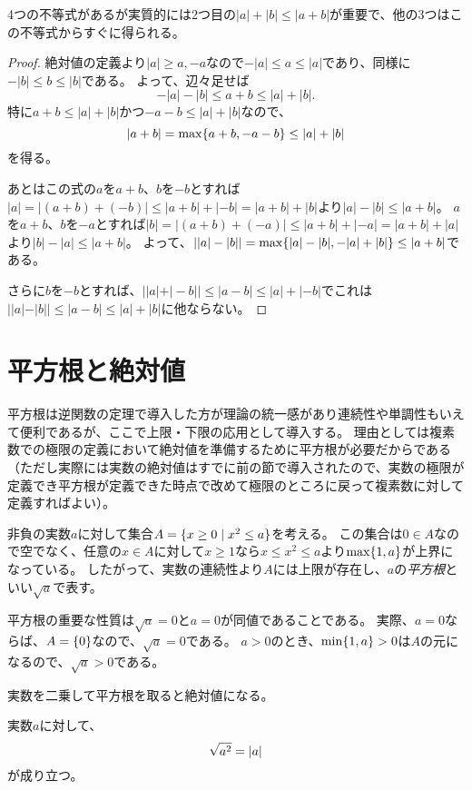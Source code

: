 4つの不等式があるが実質的には2つ目の$|a|+|b| \le |a+b|$が重要で、他の3つはこの不等式からすぐに得られる。

\begin{proof}
絶対値の定義より$|a| \ge a, -a$なので$-|a| \le a \le |a|$であり、同様に$-|b| \le b \le |b|$である。
よって、辺々足せば
$$
-|a|-|b| \le a+b \le |a|+|b|.
$$
特に$a+b \le |a|+|b|$かつ$-a-b \le |a|+|b|$なので、
$$
|a+b| = \max\{ a+b, -a-b \} \le |a|+|b|
$$
を得る。

あとはこの式の$a$を$a+b$、$b$を$-b$とすれば$|a| = |(a+b)+(-b)| \le |a+b|+|-b| = |a+b|+|b|$より$|a|-|b| \le |a+b|$。
$a$を$a+b$、$b$を$-a$とすれば$|b| = |(a+b)+(-a)| \le |a+b|+|-a| = |a+b|+|a|$より$|b|-|a| \le |a+b|$。
よって、$||a|-|b|| = \max\{ |a|-|b|, -|a|+|b| \} \le |a+b|$である。

さらに$b$を$-b$とすれば、$||a|+|-b|| \le |a-b| \le |a|+|-b|$でこれは$||a|-|b|| \le |a-b| \le |a|+|b|$に他ならない。
\end{proof}

\section{平方根と絶対値}

平方根は逆関数の定理で導入した方が理論の統一感があり連続性や単調性もいえて便利であるが、ここで上限・下限の応用として導入する。
理由としては複素数での極限の定義において絶対値を準備するために平方根が必要だからである（ただし実際には実数の絶対値はすでに前の節で導入されたので、実数の極限が定義でき平方根が定義できた時点で改めて極限のところに戻って複素数に対して定義すればよい）。

非負の実数$a$に対して集合$A = \{ x \ge 0 \mid x^2 \le a \}$を考える。
この集合は$0 \in A$なので空でなく、任意の$x \in A$に対して$x \ge 1$なら$x \le x^2 \le a$より$\max\{ 1, a \}$が上界になっている。
したがって、実数の連続性より$A$には上限が存在し、$a$の\emph{平方根}といい$\sqrt{a}$で表す。

平方根の重要な性質は$\sqrt{a} = 0$と$a = 0$が同値であることである。
実際、$a = 0$ならば、$A = \{ 0 \}$なので、$\sqrt{a} = 0$である。
$a > 0$のとき、$\min\{ 1, a \} > 0$は$A$の元になるので、$\sqrt{a} > 0$である。

実数を二乗して平方根を取ると絶対値になる。

\begin{proposition}[平方根と実数の絶対値]
実数$a$に対して、
$$
\sqrt{a^2} = \abs{a}
$$
が成り立つ。
\end{proposition}

